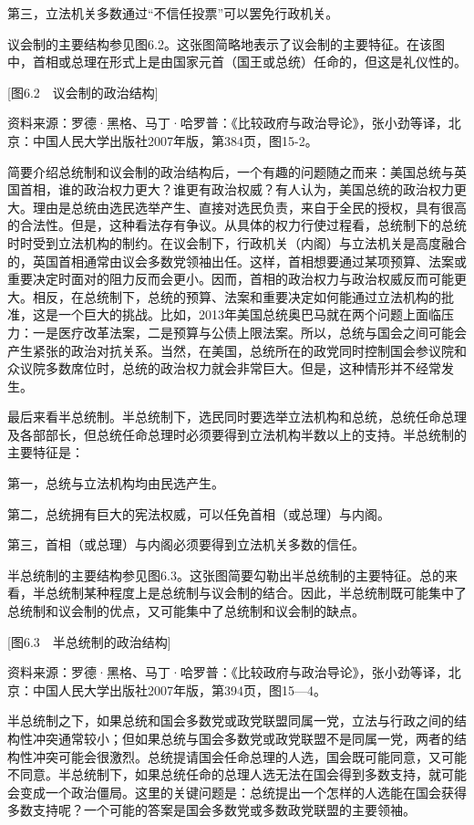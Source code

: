 第三，立法机关多数通过“不信任投票”可以罢免行政机关。

议会制的主要结构参见图6.2。这张图简略地表示了议会制的主要特征。在该图中，首相或总理在形式上是由国家元首（国王或总统）任命的，但这是礼仪性的。

[图6.2　议会制的政治结构]

资料来源：罗德·黑格、马丁·哈罗普：《比较政府与政治导论》，张小劲等译，北京：中国人民大学出版社2007年版，第384页，图15-2。

简要介绍总统制和议会制的政治结构后，一个有趣的问题随之而来：美国总统与英国首相，谁的政治权力更大？谁更有政治权威？有人认为，美国总统的政治权力更大。理由是总统由选民选举产生、直接对选民负责，来自于全民的授权，具有很高的合法性。但是，这种看法存有争议。从具体的权力行使过程看，总统制下的总统时时受到立法机构的制约。在议会制下，行政机关（内阁）与立法机关是高度融合的，英国首相通常由议会多数党领袖出任。这样，首相想要通过某项预算、法案或重要决定时面对的阻力反而会更小。因而，首相的政治权力与政治权威反而可能更大。相反，在总统制下，总统的预算、法案和重要决定如何能通过立法机构的批准，这是一个巨大的挑战。比如，2013年美国总统奥巴马就在两个问题上面临压力：一是医疗改革法案，二是预算与公债上限法案。所以，总统与国会之间可能会产生紧张的政治对抗关系。当然，在美国，总统所在的政党同时控制国会参议院和众议院多数席位时，总统的政治权力就会非常巨大。但是，这种情形并不经常发生。

最后来看半总统制。半总统制下，选民同时要选举立法机构和总统，总统任命总理及各部部长，但总统任命总理时必须要得到立法机构半数以上的支持。半总统制的主要特征是：

第一，总统与立法机构均由民选产生。

第二，总统拥有巨大的宪法权威，可以任免首相（或总理）与内阁。

第三，首相（或总理）与内阁必须要得到立法机关多数的信任。

半总统制的主要结构参见图6.3。这张图简要勾勒出半总统制的主要特征。总的来看，半总统制某种程度上是总统制与议会制的结合。因此，半总统制既可能集中了总统制和议会制的优点，又可能集中了总统制和议会制的缺点。

[图6.3　半总统制的政治结构]

资料来源：罗德·黑格、马丁·哈罗普：《比较政府与政治导论》，张小劲等译，北京：中国人民大学出版社2007年版，第394页，图15—4。

半总统制之下，如果总统和国会多数党或政党联盟同属一党，立法与行政之间的结构性冲突通常较小；但如果总统与国会多数党或政党联盟不是同属一党，两者的结构性冲突可能会很激烈。总统提请国会任命总理的人选，国会既可能同意，又可能不同意。半总统制下，如果总统任命的总理人选无法在国会得到多数支持，就可能会变成一个政治僵局。这里的关键问题是：总统提出一个怎样的人选能在国会获得多数支持呢？一个可能的答案是国会多数党或多数政党联盟的主要领袖。

